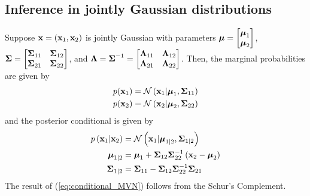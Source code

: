 \documentclass{article}
\begin{document}
\subsection{Inference in jointly Gaussian distributions}
Suppose ${\mathbf{x}} = \left( {\mathbf{x}}_1, {\mathbf{x}}_2 \right)$ is jointly Gaussian with parameters $\hbox{\boldmath$\mu$} = \begin{bmatrix}\hbox{\boldmath$\mu$}_1 \\ \hbox{\boldmath$\mu$}_2\end{bmatrix}$, $\hbox{\boldmath$\Sigma$} = \begin{bmatrix}\hbox{\boldmath$\Sigma$}_{11} & \hbox{\boldmath$\Sigma$}_{12} \\ \hbox{\boldmath$\Sigma$}_{21} & \hbox{\boldmath$\Sigma$}_{22}\end{bmatrix}$, and $\hbox{\boldmath$\Lambda$} = \hbox{\boldmath$\Sigma$}^{-1} = \begin{bmatrix}\hbox{\boldmath$\Lambda$}_{11} & \hbox{\boldmath$\Lambda$}_{12} \\ \hbox{\boldmath$\Lambda$}_{21} & \hbox{\boldmath$\Lambda$}_{22}\end{bmatrix}$. Then, the marginal probabilities are given by
\begin{equation}
  \label{eq:marginal}
  \begin{split}
    p(\xx_1) &= \mathcal{N}\pn{\xx_1 | \mub_1 , \Sigmab_{11}} \\
    p(\xx_2) &= \mathcal{N}\pn{\xx_2 | \mub_2 , \Sigmab_{22}}
  \end{split}
\end{equation}
and the posterior conditional is given by
\begin{equation}
  \label{eq:posterior_MVN}
  \begin{split}
    p\pn{\xx_1 | \xx_2} &= \mathcal{N}\pn{\xx_1 | \mub_{1|2}, \Sigmab_{1|2}} \\
    \mub_{1|2} &= \mub_1 + \Sigmab_{12}\Sigmab_{22}^{-1}\pn{\xx_2 - \mub_2} \\
    \Sigmab_{1|2} &= \Sigmab_{11} - \Sigmab_{12}\Sigmab_{22}^{-1}\Sigmab_{21}
  \end{split}
\end{equation}
The result of (\ref{eq:conditional_MVN}) follows from the Schur's Complement.
  
\end{document}
